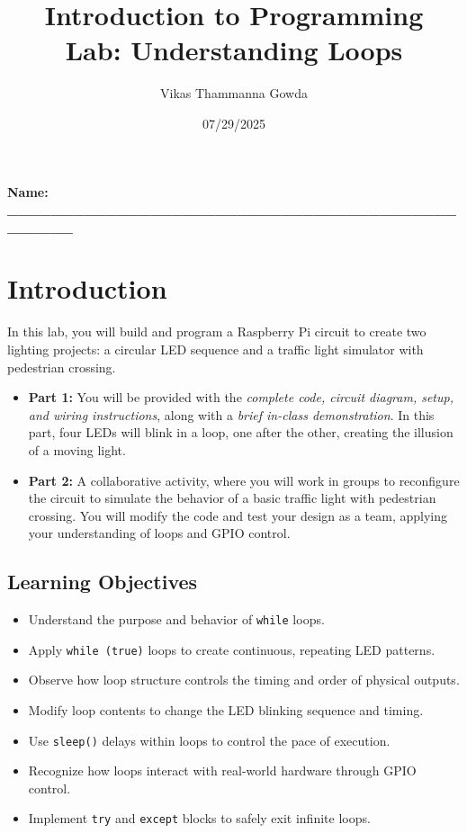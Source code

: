 \documentclass[a4paper,11pt]{article}
\title{Introduction to Programming \\ Lab: Understanding Loops}
\author{Vikas Thammanna Gowda}
\date{07/29/2025}
\begin{document}
\maketitle

\noindent \textbf{Name: \_\_\_\_\_\_\_\_\_\_\_\_\_\_\_\_\_\_\_\_\_\_\_\_\_\_\_\_\_\_\_\_\_\_\_\_\_\_\_\_\_\_\_\_\_\_\_}
\section*{Introduction}
In this lab, you will build and program a Raspberry Pi circuit to create two 
lighting projects: a circular LED sequence and a traffic light simulator with pedestrian crossing.

\begin{itemize}
\item \textbf{Part 1:} You will be provided with the \textit{complete code, circuit diagram, setup, 
and wiring instructions}, along with a \textit{brief in-class demonstration}. 
In this part, four LEDs will blink in a loop, one after the other, 
creating the illusion of a moving light.

\item \textbf{Part 2:} A collaborative activity, where you will work in groups to reconfigure 
the circuit to simulate the behavior of a basic traffic light with pedestrian crossing. 
You will modify the code and test your design as a team, 
applying your understanding of loops and GPIO control. 
\end{itemize} 

\subsection*{Learning Objectives}
\begin{itemize}
    \item Understand the purpose and behavior of \texttt{while} loops.

\item Apply \texttt{while (true)} loops to create continuous, repeating LED patterns.

\item Observe how loop structure controls the timing and order of physical outputs.

\item Modify loop contents to change the LED blinking sequence and timing.

\item Use \texttt{sleep()} delays within loops to control the pace of execution.

\item Recognize how loops interact with real-world hardware through GPIO control.

\item Implement \texttt{try} and \texttt{except} blocks to safely exit infinite loops.
\end{itemize}
\end{document}
